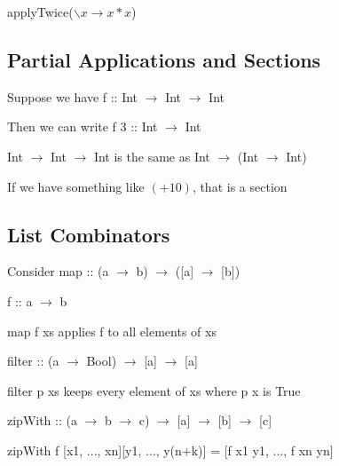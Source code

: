 \documentclass[12pt]{article}
\begin{document}
applyTwice($\backslash x \to x * x$)

\subsection{Partial Applications and Sections}

Suppose we have f :: Int $\to$ Int $\to$ Int

Then we can write f 3 :: Int $\to$ Int

Int $\to$ Int $\to$ Int is the same as Int $\to$ (Int $\to$ Int)

If we have something like $(+ 10)$, that is a section

\subsection{List Combinators}

Consider map :: (a $\to$ b) $\to$ ([a] $\to$ [b])

f :: a $\to$ b

map f xs applies f to all elements of xs

filter :: (a $\to$ Bool) $\to$ [a] $\to$ [a]

filter p xs keeps every element of xs where p x is True

zipWith :: (a $\to$ b $\to$ c) $\to$ [a] $\to$ [b] $\to$ [c]

zipWith f [x1, ..., xn][y1, ..., y(n+k)] = [f x1 y1, ..., f xn yn]
\end{document}
